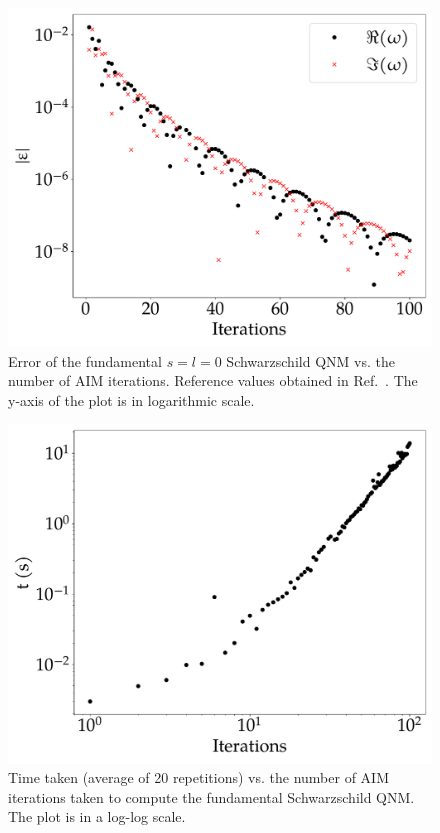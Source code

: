 \begin{figure}[!ht]
  \centering
  \includegraphics[width=\linewidth]{img/aim_qnm/err.pdf}
  \caption{Error of the fundamental $s=l=0$ Schwarzschild QNM vs. the number of AIM iterations. Reference values obtained in Ref.~\cite{BertiQNMData}. The y-axis of the plot is in logarithmic scale.}
  \label{fig:package_error}
\end{figure}

\begin{figure}[!ht]
  \centering
  \includegraphics[width=\linewidth]{img/aim_qnm/perf.pdf}
  \caption{Time taken (average of 20 repetitions) vs. the number of AIM iterations taken to compute the fundamental Schwarzschild QNM. The plot is in a log-log scale.}
  \label{fig:package_perf}
\end{figure}

